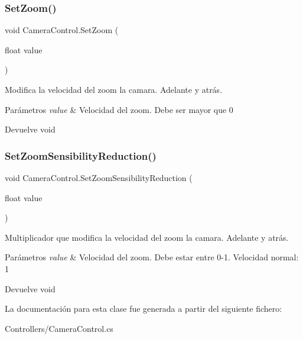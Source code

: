 \subsubsection{\texorpdfstring{SetZoom()}{SetZoom()}}
{\footnotesize\ttfamily void Camera\+Control.\+Set\+Zoom (\begin{DoxyParamCaption}\item[{float}]{value }\end{DoxyParamCaption})\hspace{0.3cm}{\ttfamily [inline]}}

Modifica la velocidad del zoom la camara. Adelante y atrás. 
\begin{DoxyParams}{Parámetros}
{\em value} & Velocidad del zoom. Debe ser mayor que 0 \\
\hline
\end{DoxyParams}
\begin{DoxyReturn}{Devuelve}
void 
\end{DoxyReturn}
\mbox{\label{class_camera_control_a77c2147ce9a478e7fbee646fe049aa02}} 
\subsubsection{\texorpdfstring{SetZoomSensibilityReduction()}{SetZoomSensibilityReduction()}}
{\footnotesize\ttfamily void Camera\+Control.\+Set\+Zoom\+Sensibility\+Reduction (\begin{DoxyParamCaption}\item[{float}]{value }\end{DoxyParamCaption})\hspace{0.3cm}{\ttfamily [inline]}}

Multiplicador que modifica la velocidad del zoom la camara. Adelante y atrás. 
\begin{DoxyParams}{Parámetros}
{\em value} & Velocidad del zoom. Debe estar entre 0-\/1. Velocidad normal\+: 1 \\
\hline
\end{DoxyParams}
\begin{DoxyReturn}{Devuelve}
void 
\end{DoxyReturn}


La documentación para esta clase fue generada a partir del siguiente fichero\+:\begin{DoxyCompactItemize}
\item 
Controllers/Camera\+Control.\+cs\end{DoxyCompactItemize}
